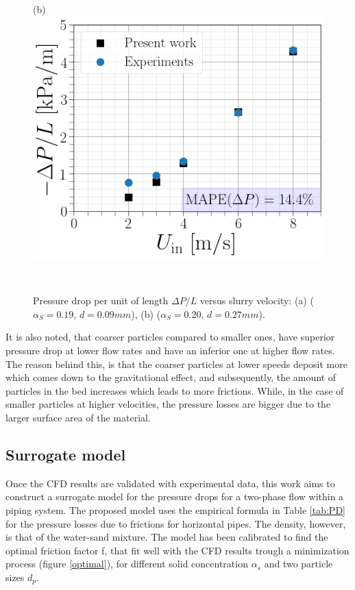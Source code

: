 \documentclass[review,3p,times,12pt]{elsarticle}
\begin{document}
\begin{minipage}[t]{0.5\textwidth}
\begin{figure}[H]
\begin{center}
(b)\includegraphics[scale = 0.3]{DP27}
 \end{center}
\end{figure}
\end{minipage}\\
\begin{figure}[H]
    \centering
    \caption{Pressure drop per unit of length $\Delta P/L$  versus slurry velocity: (a) ($\alpha_S=0.19$, $d=0.09 mm$), (b) ($\alpha_S=0.20$, $d=0.27 mm$).}
    \label{P}
\end{figure}

It is also noted, that coarser particles compared to smaller ones, have superior pressure drop at lower flow rates and have an inferior one at higher flow rates.  The reason behind this, is that the coarser particles at lower speeds deposit more which comes down to the gravitational effect, and subsequently, the amount of particles in the bed increases which leads to more frictions. While, in the case of smaller particles at higher velocities, the  pressure losses are bigger due to the larger surface area of the material.
\subsection{Surrogate model}
Once the CFD results are validated with experimental data, this work aims to construct a surrogate model for the pressure drops for a two-phase flow within a piping system. The proposed model uses the empirical formula in Table \ref{tab:PD} for the pressure losses due to frictions for horizontal pipes. The density, however, is that of the water-sand mixture. The model has been calibrated to find the optimal friction factor f, that fit well with the CFD results trough a minimization process (figure \ref{optimal}), for different solid concentration $\alpha_s$ and two particle sizes $d_p$. %
\end{document}
